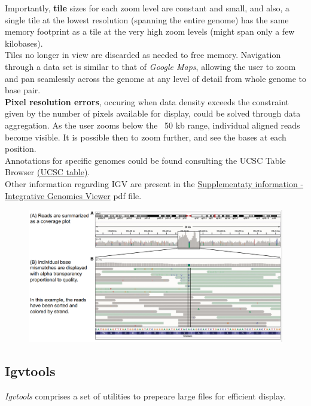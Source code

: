 Importantly, \textbf{tile} sizes for each zoom level are constant and small, and
also, a single tile at the lowest resolution (spanning the entire genome) has
the same memory footprint as a tile at the very high zoom levels (might span
only a few kilobases). \\
Tiles no longer in view are discarded as needed to free memory. Navigation
through a data set is similar to that of \textit{Google Maps}, allowing the user
to zoom and pan seamlessly across the genome at any level of detail from whole
genome to base pair.\\

\textbf{Pixel resolution errors}, occuring when data density exceeds the
constraint given by the number of pixels available for display, could be solved
through data aggregation. As the user zooms below the ~50 kb range, individual
aligned reads become visible. It is possible then to zoom further, and see the
bases at each position.\\
 
Annotations for specific genomes could be found consulting the UCSC Table
Browser \href{http://genome.ucsc.edu/cgi-bin/hgTables}{(UCSC table)}.\\

Other information regarding IGV are present in the
\href{https://authors.library.caltech.edu/72234/2/nbt.1754-S1.pdf}{Supplementaty
information - Integrative Genomics Viewer} pdf file.

\begin{figure}[H]
    \caption{}
    \centering
    \includegraphics[width=1\textwidth]{IGVReadsView.PNG}
    \label{ViewReads}
\end{figure} 


\subsection{Igvtools}
\textit{Igvtools} comprises a set of utilities to prepeare large files for efficient
display.

